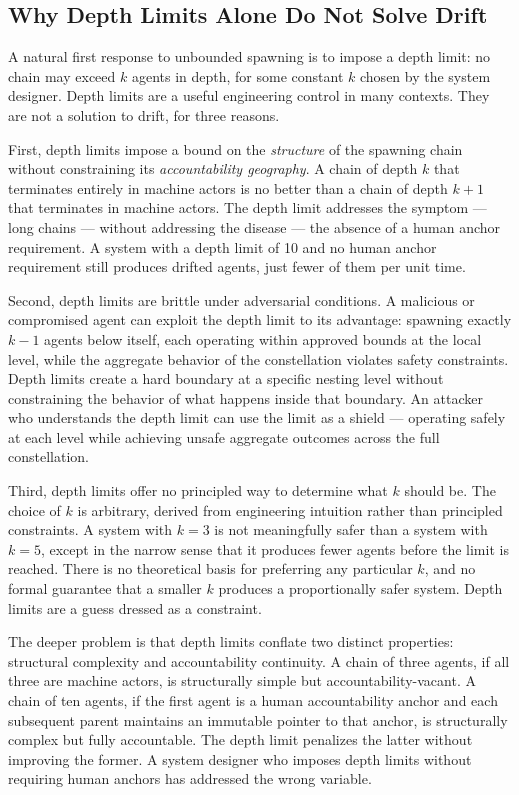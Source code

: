 \documentclass[12pt]{article}
\begin{document}
\subsection{Why Depth Limits Alone Do Not Solve Drift}

A natural first response to unbounded spawning is to impose a depth limit: no chain may exceed $k$ agents in depth, for some constant $k$ chosen by the system designer. Depth limits are a useful engineering control in many contexts. They are not a solution to drift, for three reasons.

First, depth limits impose a bound on the \textit{structure} of the spawning chain without constraining its \textit{accountability geography}. A chain of depth $k$ that terminates entirely in machine actors is no better than a chain of depth $k+1$ that terminates in machine actors. The depth limit addresses the symptom — long chains — without addressing the disease — the absence of a human anchor requirement. A system with a depth limit of 10 and no human anchor requirement still produces drifted agents, just fewer of them per unit time.

Second, depth limits are brittle under adversarial conditions. A malicious or compromised agent can exploit the depth limit to its advantage: spawning exactly $k-1$ agents below itself, each operating within approved bounds at the local level, while the aggregate behavior of the constellation violates safety constraints. Depth limits create a hard boundary at a specific nesting level without constraining the behavior of what happens inside that boundary. An attacker who understands the depth limit can use the limit as a shield — operating safely at each level while achieving unsafe aggregate outcomes across the full constellation.

Third, depth limits offer no principled way to determine what $k$ should be. The choice of $k$ is arbitrary, derived from engineering intuition rather than principled constraints. A system with $k=3$ is not meaningfully safer than a system with $k=5$, except in the narrow sense that it produces fewer agents before the limit is reached. There is no theoretical basis for preferring any particular $k$, and no formal guarantee that a smaller $k$ produces a proportionally safer system. Depth limits are a guess dressed as a constraint.

The deeper problem is that depth limits conflate two distinct properties: structural complexity and accountability continuity. A chain of three agents, if all three are machine actors, is structurally simple but accountability-vacant. A chain of ten agents, if the first agent is a human accountability anchor and each subsequent parent maintains an immutable pointer to that anchor, is structurally complex but fully accountable. The depth limit penalizes the latter without improving the former. A system designer who imposes depth limits without requiring human anchors has addressed the wrong variable.
\end{document}
